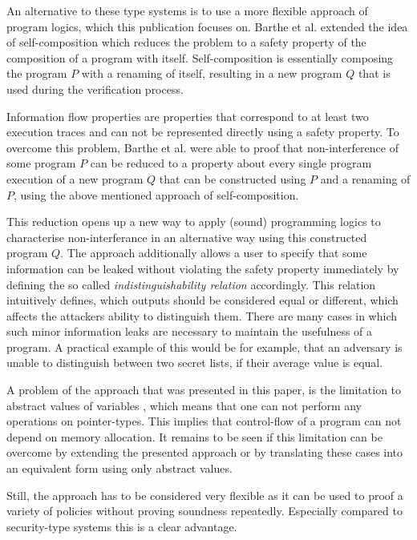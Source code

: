 \documentclass[a4paper,UKenglish]{lipics-v2018}
\begin{document}
An alternative to these type systems is to use a more flexible approach of program logics, which this publication focuses on. Barthe et al. extended the idea of self-composition which reduces the problem to a safety property of the composition of a program with itself. Self-composition is essentially composing the program $P$ with a renaming of itself, resulting in a new program $Q$ that is used during the verification process.
\cite{information_flow_by_self_composition}

Information flow properties are properties that correspond to at least two execution traces and can not be represented directly using a safety property. To overcome this problem, Barthe et al. were able to proof that non-interference of some program $P$ can be reduced to a property about every single program execution of a new program $Q$ that can be constructed using $P$ and a renaming of $P$, using the above mentioned approach of self-composition.
\cite{information_flow_by_self_composition}

This reduction opens up a new way to apply (sound) programming logics to characterise non-interferance in an alternative way using this constructed program $Q$. The approach additionally allows a user to specify that some information can be leaked without violating the safety property immediately by defining the so called \textit{indistinguishability relation} accordingly. This relation intuitively defines, which outputs should be considered equal or different, which affects the attackers ability to distinguish them. There are many cases in which such minor information leaks are necessary to maintain the usefulness of a program. A practical example of this would be for example, that an adversary is unable to distinguish between two secret lists, if their average value is equal.
\cite{information_flow_by_self_composition}

A problem of the approach that was presented in this paper, is the limitation to abstract values of variables
\cite{information_flow_by_self_composition}, which means that one can not perform any operations on pointer-types. This implies that control-flow of a program can not depend on memory allocation. It remains to be seen if this limitation can be overcome by extending the presented approach or by translating these cases into an equivalent form using only abstract values.

Still, the approach has to be considered very flexible as it can be used to proof a variety of policies without proving soundness repeatedly. Especially compared to security-type systems this is a clear advantage.
\end{document}
